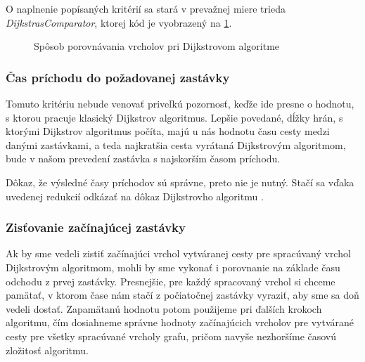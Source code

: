 O naplnenie popísaných kritérií sa stará v prevažnej miere trieda \textit{DijkstrasComparator}, ktorej kód je vyobrazený na \ref{DijsktrasCmp}.

\begin{figure}[H]
\caption{Spôsob porovnávania vrcholov pri Dijkstrovom algoritme}
\label{DijsktrasCmp}
\end{figure}


\subsubsection{Čas príchodu do požadovanej zastávky}

Tomuto kritériu nebude venovať priveľkú pozornosť, keďže ide presne o hodnotu, s ktorou pracuje klasický Dijkstrov algoritmus. Lepšie povedané, dĺžky hrán, s ktorými Dijkstrov algoritmus počíta, majú u nás hodnotu času cesty medzi danými zastávkami, a teda najkratšia cesta vyrátaná Dijkstrovým algoritmom, bude v našom prevedení zastávka s najskorším časom príchodu.\newline

Dôkaz, že výsledné časy príchodov sú správne, preto nie je nutný. Stačí sa vďaka uvedenej redukcií odkázať na dôkaz Dijkstrovho algoritmu \cite[kapitola 2.2.1]{duris2009}.\newline


\subsubsection{Zisťovanie začínajúcej zastávky}

Ak by sme vedeli zistiť začínajúci vrchol vytváranej cesty pre spracúvaný vrchol Dijkstrovým algoritmom, mohli by sme vykonať i porovnanie na základe času odchodu z prvej zastávky. Presnejšie, pre každý spracovaný vrchol si chceme pamätať, v ktorom čase nám stačí z počiatočnej zastávky vyraziť, aby sme sa doň vedeli dostať. Zapamätanú hodnotu potom použijeme pri ďalších krokoch algoritmu, čím dosiahneme správne hodnoty začínajúcich vrcholov pre vytvárané cesty pre všetky spracúvané vrcholy grafu, pričom navyše nezhoršíme časovú zložitosť algoritmu.\newline

